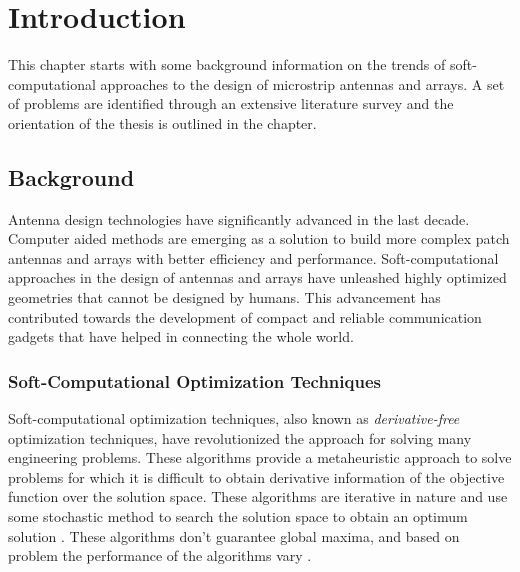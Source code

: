 \chapter{Introduction}
\label{chap:chap1}
\def\baselinestretch{1.66}
This chapter starts with some background information on the trends of soft-computational approaches to the design of microstrip antennas and arrays. A set of problems are identified through an extensive literature survey and the orientation of the thesis is outlined in the chapter.

\section{Background} \label{c1sec_background}
Antenna design technologies have significantly advanced in the last decade. Computer aided methods are emerging as a solution to build more complex patch antennas and arrays with better efficiency and performance. Soft-computational approaches in the design of antennas and arrays have unleashed highly optimized geometries that cannot be designed by humans. This advancement has contributed towards the development of compact and reliable communication gadgets that have helped in connecting the whole world.

\subsection{Soft-Computational Optimization Techniques}
Soft-computational optimization techniques, also known as \emph{derivative-free} optimization techniques, have revolutionized the approach for solving many engineering problems. These algorithms provide a metaheuristic approach to solve problems for which it is difficult to obtain derivative information of the objective function over the solution space. These algorithms are iterative in nature and use some stochastic method to search the solution space to obtain an optimum solution \cite {softCompBook}. These algorithms don't guarantee global maxima, and based on problem the performance of the algorithms vary \cite{compCAD4Arry}.

